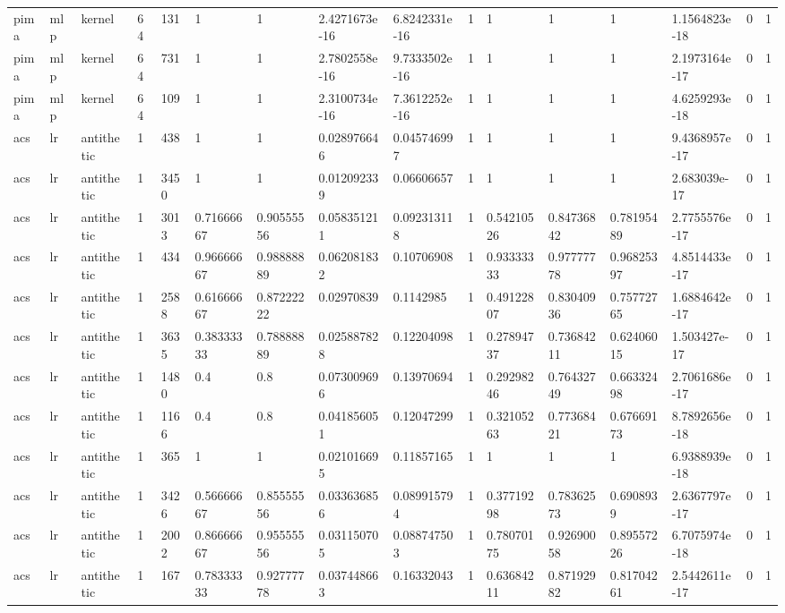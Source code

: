 \begin{tabular}{llllllllllllllll}
pima & mlp & kernel & 64 & 131 & 1 & 1 & 2.4271673e-16 & 6.8242331e-16 & 1 & 1 & 1 & 1 & 1.1564823e-18 & 0 & 1 \\
pima & mlp & kernel & 64 & 731 & 1 & 1 & 2.7802558e-16 & 9.7333502e-16 & 1 & 1 & 1 & 1 & 2.1973164e-17 & 0 & 1 \\
pima & mlp & kernel & 64 & 109 & 1 & 1 & 2.3100734e-16 & 7.3612252e-16 & 1 & 1 & 1 & 1 & 4.6259293e-18 & 0 & 1 \\
acs & lr & antithetic & 1 & 438 & 1 & 1 & 0.028976646 & 0.045746997 & 1 & 1 & 1 & 1 & 9.4368957e-17 & 0 & 1 \\
acs & lr & antithetic & 1 & 3450 & 1 & 1 & 0.012092339 & 0.06606657 & 1 & 1 & 1 & 1 & 2.683039e-17 & 0 & 1 \\
acs & lr & antithetic & 1 & 3013 & 0.71666667 & 0.90555556 & 0.058351211 & 0.092313118 & 1 & 0.54210526 & 0.84736842 & 0.78195489 & 2.7755576e-17 & 0 & 1 \\
acs & lr & antithetic & 1 & 434 & 0.96666667 & 0.98888889 & 0.062081832 & 0.10706908 & 1 & 0.93333333 & 0.97777778 & 0.96825397 & 4.8514433e-17 & 0 & 1 \\
acs & lr & antithetic & 1 & 2588 & 0.61666667 & 0.87222222 & 0.02970839 & 0.1142985 & 1 & 0.49122807 & 0.83040936 & 0.75772765 & 1.6884642e-17 & 0 & 1 \\
acs & lr & antithetic & 1 & 3635 & 0.38333333 & 0.78888889 & 0.025887828 & 0.12204098 & 1 & 0.27894737 & 0.73684211 & 0.62406015 & 1.503427e-17 & 0 & 1 \\
acs & lr & antithetic & 1 & 1480 & 0.4 & 0.8 & 0.073009696 & 0.13970694 & 1 & 0.29298246 & 0.76432749 & 0.66332498 & 2.7061686e-17 & 0 & 1 \\
acs & lr & antithetic & 1 & 1166 & 0.4 & 0.8 & 0.041856051 & 0.12047299 & 1 & 0.32105263 & 0.77368421 & 0.67669173 & 8.7892656e-18 & 0 & 1 \\
acs & lr & antithetic & 1 & 365 & 1 & 1 & 0.021016695 & 0.11857165 & 1 & 1 & 1 & 1 & 6.9388939e-18 & 0 & 1 \\
acs & lr & antithetic & 1 & 3426 & 0.56666667 & 0.85555556 & 0.033636856 & 0.089915794 & 1 & 0.37719298 & 0.78362573 & 0.6908939 & 2.6367797e-17 & 0 & 1 \\
acs & lr & antithetic & 1 & 2002 & 0.86666667 & 0.95555556 & 0.031150705 & 0.088747503 & 1 & 0.78070175 & 0.92690058 & 0.89557226 & 6.7075974e-18 & 0 & 1 \\
acs & lr & antithetic & 1 & 167 & 0.78333333 & 0.92777778 & 0.037448663 & 0.16332043 & 1 & 0.63684211 & 0.87192982 & 0.81704261 & 2.5442611e-17 & 0 & 1 \\

\end{tabular}
